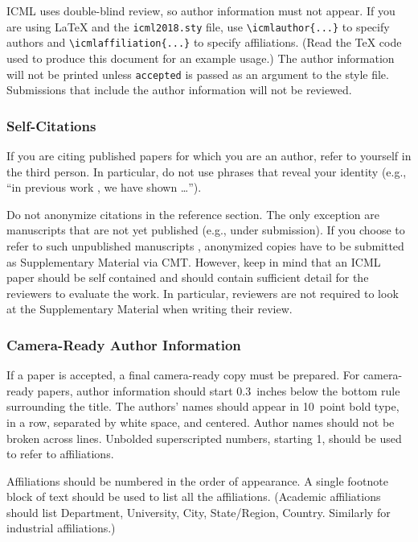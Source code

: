 \documentclass{article}
\begin{document}
ICML uses double-blind review, so author information must not appear. If
you are using \LaTeX\/ and the \texttt{icml2018.sty} file, use
\verb+\icmlauthor{...}+ to specify authors and \verb+\icmlaffiliation{...}+ to specify affiliations. (Read the TeX code used to produce this document for an example usage.) The author information
will not be printed unless \texttt{accepted} is passed as an argument to the
style file.
Submissions that include the author information will not
be reviewed.

\subsubsection{Self-Citations}

If you are citing published papers for which you are an author, refer
to yourself in the third person. In particular, do not use phrases
that reveal your identity (e.g., ``in previous work \cite{langley00}, we
have shown \ldots'').

Do not anonymize citations in the reference section. The only exception are manuscripts that are
not yet published (e.g., under submission). If you choose to refer to
such unpublished manuscripts %
, anonymized copies have
to be submitted
as Supplementary Material via CMT\@. However, keep in mind that an ICML
paper should be self contained and should contain sufficient detail
for the reviewers to evaluate the work. In particular, reviewers are
not required to look at the Supplementary Material when writing their
review.

\subsubsection{Camera-Ready Author Information}
\label{final author}

If a paper is accepted, a final camera-ready copy must be prepared.
%
For camera-ready papers, author information should start 0.3~inches below the
bottom rule surrounding the title. The authors' names should appear in 10~point
bold type, in a row, separated by white space, and centered. Author names should
not be broken across lines. Unbolded superscripted numbers, starting 1, should
be used to refer to affiliations.

Affiliations should be numbered in the order of appearance. A single footnote
block of text should be used to list all the affiliations. (Academic
affiliations should list Department, University, City, State/Region, Country.
Similarly for industrial affiliations.)
\end{document}
